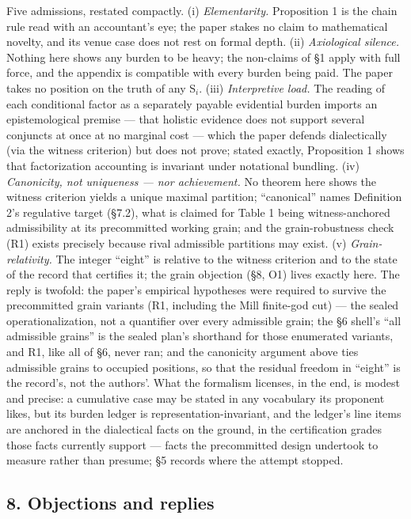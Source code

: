 Five admissions, restated compactly. (i) \emph{Elementarity.} Proposition 1 is the chain rule read with an accountant's eye; the paper stakes no claim to mathematical novelty, and its venue case does not rest on formal depth. (ii) \emph{Axiological silence.} Nothing here shows any burden to be heavy; the non-claims of \S{}1 apply with full force, and the appendix is compatible with every burden being paid. The paper takes no position on the truth of any S$_i$. (iii) \emph{Interpretive load.} The reading of each conditional factor as a separately payable evidential burden imports an epistemological premise --- that holistic evidence does not support several conjuncts at once at no marginal cost --- which the paper defends dialectically (via the witness criterion) but does not prove; stated exactly, Proposition 1 shows that factorization accounting is invariant under notational bundling. (iv) \emph{Canonicity, not uniqueness --- nor achievement.} No theorem here shows the witness criterion yields a unique maximal partition; ``canonical'' names Definition 2's regulative target (\S{}7.2), what is claimed for Table 1 being witness-anchored admissibility at its precommitted working grain; and the grain-robustness check (R1) exists precisely because rival admissible partitions may exist. (v) \emph{Grain-relativity.} The integer ``eight'' is relative to the witness criterion and to the state of the record that certifies it; the grain objection (\S{}8, O1) lives exactly here. The reply is twofold: the paper's empirical hypotheses were required to survive the precommitted grain variants (R1, including the Mill finite-god cut) --- the sealed operationalization, not a quantifier over every admissible grain; the \S{}6 shell's ``all admissible grains'' is the sealed plan's shorthand for those enumerated variants, and R1, like all of \S{}6, never ran; and the canonicity argument above ties admissible grains to occupied positions, so that the residual freedom in ``eight'' is the record's, not the authors'. What the formalism licenses, in the end, is modest and precise: a cumulative case may be stated in any vocabulary its proponent likes, but its burden ledger is representation-invariant, and the ledger's line items are anchored in the dialectical facts on the ground, in the certification grades those facts currently support --- facts the precommitted design undertook to measure rather than presume; \S{}5 records where the attempt stopped.

\subsection{8. Objections and replies}\label{objections-and-replies}


